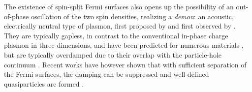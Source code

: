 \documentclass[aps,prl,reprint,twocolumns,superscriptaddress]{revtex4-2}
\begin{document}
	The existence of spin-split Fermi surfaces also opens up the possibility of an out-of-phase oscillation of the two spin densities, realizing a \emph{demon}: an acoustic, electrically neutral type of plasmon, first proposed by \textcite{pinesElectronInteractionSolids1956} and first observed by \textcite{husainPinesDemonObserved2023}. They are typically gapless, in contrast to the conventional in-phase charge plasmon in three dimensions, and have  been predicted for numerous materials \cite{pinesElectronInteractionSolids1956,ruvaldsAreThereAcoustic1981}, but are typically overdamped due to their overlap with the particle-hole continuum \cite{dassarmaCollectiveModesSpatially1981, sensarmaDynamicScreeningLowenergy2010,agarwalLonglivedSpinPlasmons2014,sadhukhanNovelUndampedGapless2020}. Recent works have however shown that with sufficient separation of the Fermi surfaces, the damping can be suppressed and well-defined quasiparticles are formed \cite{agarwalLonglivedSpinPlasmons2014,husainPinesDemonObserved2023}.
	
\end{document}
